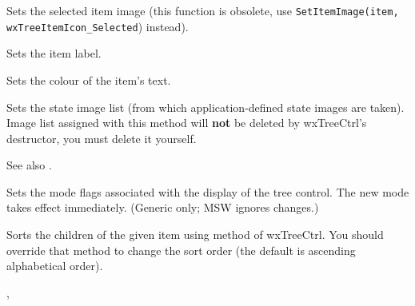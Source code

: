 \label{wxtreectrlsetitemselectedimage}


Sets the selected item image (this function is obsolete, use {\tt SetItemImage(item, wxTreeItemIcon\_Selected}) instead).

\label{wxtreectrlsetitemtext}


Sets the item label.

\label{wxtreectrlsetitemtextcolour}


Sets the colour of the item's text.

\label{wxtreectrlsetstateimagelist}


Sets the state image list (from which application-defined state images are taken).
Image list assigned with this method will
{\bf not} be deleted by wxTreeCtrl's destructor, you must delete it yourself.

See also .


Sets the mode flags associated with the display of the tree control.
The new mode takes effect immediately.
(Generic only; MSW ignores changes.)

\label{wxtreectrlsortchildren}


Sorts the children of the given item using
 method of wxTreeCtrl. You
should override that method to change the sort order (the default is ascending
alphabetical order).


, 

